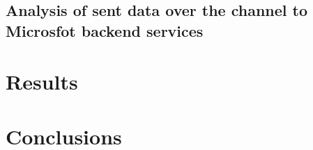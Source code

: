 \documentclass[11pt,a4paper,twoside]{tesis}
\begin{document}
\subsection*{Analysis of sent data over the channel to Microsfot backend services}



\section*{Results}
\section*{Conclusions}

%
%
%
%
%
%
%
%
%
%
%
\end{document}
